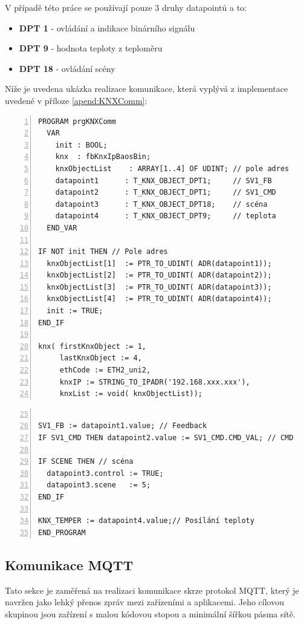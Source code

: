 V případě této práce se používají pouze 3 druhy datapointů a to:
\begin{itemize}
    \item \textbf{DPT 1} - ovládání a indikace binárního signálu
    \item \textbf{DPT 9} - hodnota teploty z teploměru
    \item \textbf{DPT 18} - ovládání scény \newline
\end{itemize}
Níže je uvedena ukázka realizace komunikace, která vyplývá z implementace uvedené v příloze \ref{apend:KNXComm}:
\begin{lstlisting}[language=ST, breaklines=true, numbers=left, numberstyle=\small, numbersep=10pt, frame=single, basicstyle=\ttfamily\small, caption={Implementace komunikace KNX/IP}, label={lst:komunikace_knx}]
PROGRAM prgKNXComm
  VAR
    init : BOOL;
    knx  : fbKnxIpBaosBin;
    knxObjectList    : ARRAY[1..4] OF UDINT; // pole adres
    datapoint1      : T_KNX_OBJECT_DPT1;     // SV1_FB
    datapoint2      : T_KNX_OBJECT_DPT1;     // SV1_CMD
    datapoint3      : T_KNX_OBJECT_DPT18;    // scéna
    datapoint4      : T_KNX_OBJECT_DPT9;     // teplota
  END_VAR

IF NOT init THEN // Pole adres
  knxObjectList[1]  := PTR_TO_UDINT( ADR(datapoint1));
  knxObjectList[2]  := PTR_TO_UDINT( ADR(datapoint2));
  knxObjectList[3]  := PTR_TO_UDINT( ADR(datapoint3));
  knxObjectList[4]  := PTR_TO_UDINT( ADR(datapoint4));
  init := TRUE;
END_IF

knx( firstKnxObject := 1,
     lastKnxObject := 4,
     ethCode := ETH2_uni2,
     knxIP := STRING_TO_IPADR('192.168.xxx.xxx'),
     knxList := void( knxObjectList));
\end{lstlisting}
\begin{lstlisting}[language=ST, breaklines=true, firstnumber=25, numbers=left, numberstyle=\small, numbersep=10pt, frame=single, basicstyle=\ttfamily\small]

SV1_FB := datapoint1.value; // Feedback
IF SV1_CMD THEN datapoint2.value := SV1_CMD.CMD_VAL; // CMD

IF SCENE THEN // scéna
  datapoint3.control := TRUE;
  datapoint3.scene   := 5;
END_IF

KNX_TEMPER := datapoint4.value;// Posílání teploty
END_PROGRAM
\end{lstlisting}
\subsection{Komunikace MQTT}
\label{subsection:MQTT}
Tato sekce je zaměřená na realizaci komunikace skrze protokol MQTT, který je navržen jako lehký přenos zpráv mezi zařízeními a aplikacemi. Jeho cílovou skupinou jsou zařízení s malou kódovou stopou a minimální šířkou pásma sítě. \cite{MQTT}


